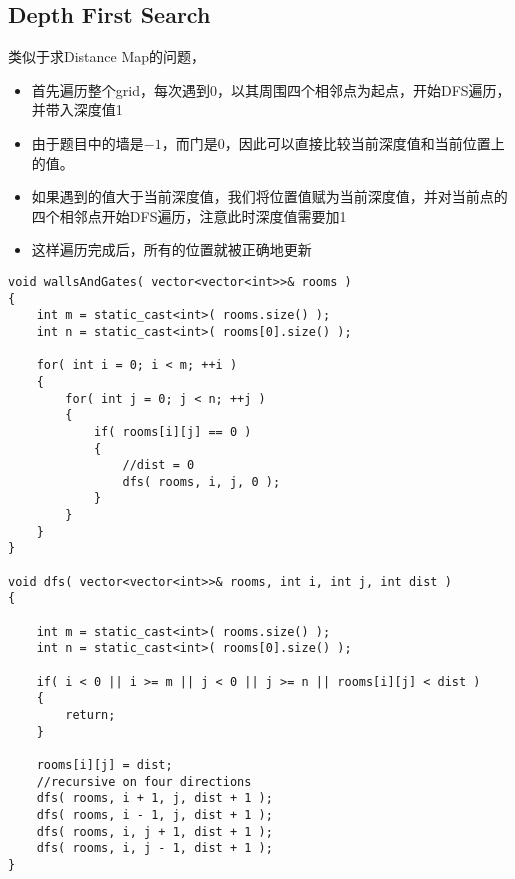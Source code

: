 \subsection{Depth First Search}
类似于求Distance Map的问题，
\begin{itemize}
\item 首先遍历整个grid，每次遇到0，以其周围四个相邻点为起点，开始DFS遍历，并带入深度值1
\item 由于题目中的墙是$-1$，而门是$0$，因此可以直接比较当前深度值和当前位置上的值。
\item 如果遇到的值大于当前深度值，我们将位置值赋为当前深度值，并对当前点的四个相邻点开始DFS遍历，注意此时深度值需要加1
\item 这样遍历完成后，所有的位置就被正确地更新
\end{itemize}
\setcounter{lstlisting}{0}
\begin{lstlisting}[style=customc, caption={DFS}]
void wallsAndGates( vector<vector<int>>& rooms )
{
    int m = static_cast<int>( rooms.size() );
    int n = static_cast<int>( rooms[0].size() );

    for( int i = 0; i < m; ++i )
    {
        for( int j = 0; j < n; ++j )
        {
            if( rooms[i][j] == 0 )
            {
                //dist = 0
                dfs( rooms, i, j, 0 );
            }
        }
    }
}

void dfs( vector<vector<int>>& rooms, int i, int j, int dist )
{

    int m = static_cast<int>( rooms.size() );
    int n = static_cast<int>( rooms[0].size() );

    if( i < 0 || i >= m || j < 0 || j >= n || rooms[i][j] < dist )
    {
        return;
    }

    rooms[i][j] = dist;
    //recursive on four directions
    dfs( rooms, i + 1, j, dist + 1 );
    dfs( rooms, i - 1, j, dist + 1 );
    dfs( rooms, i, j + 1, dist + 1 );
    dfs( rooms, i, j - 1, dist + 1 );
}
\end{lstlisting}
